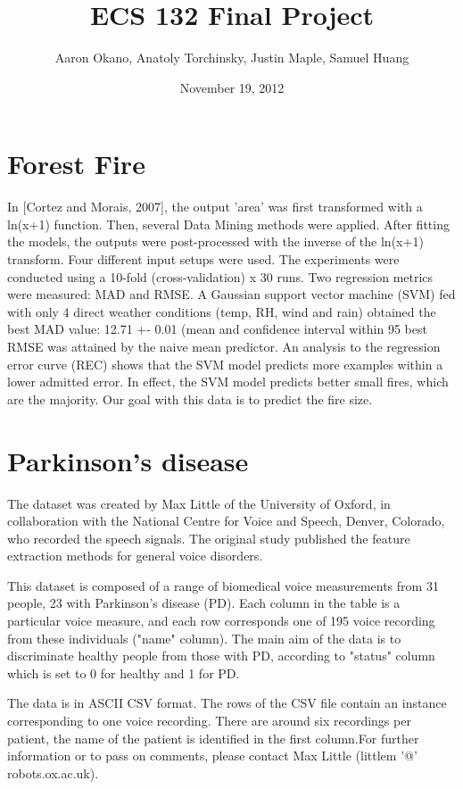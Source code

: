 \documentclass{article}
\title{ECS 132 Final Project}  %
\author{Aaron Okano, Anatoly Torchinsky, Justin Maple, Samuel Huang }    %
\date{November 19, 2012}   %
\begin{document}

\maketitle                 %

\section{Forest Fire}

In [Cortez and Morais, 2007], the output 'area' was first transformed with a ln(x+1) function. 
Then, several Data Mining methods were applied. After fitting the models, the outputs were 
post-processed with the inverse of the ln(x+1) transform. Four different input setups were 
used. The experiments were conducted using a 10-fold (cross-validation) x 30 runs. Two 
regression metrics were measured: MAD and RMSE. A Gaussian support vector machine (SVM) fed 
with only 4 direct weather conditions (temp, RH, wind and rain) obtained the best MAD value: 
12.71 +- 0.01 (mean and confidence interval within 95%
best RMSE was attained by the naive mean predictor. An analysis to the regression error curve 
(REC) shows that the SVM model predicts more examples within a lower admitted error. In effect, 
the SVM model predicts better small fires, which are the majority. Our goal with this data
is to predict the fire size.

\section{Parkinson's disease}

The dataset was created by Max Little of the University of Oxford, in collaboration with the
National Centre for Voice and Speech, Denver, Colorado, who recorded the speech signals.
The original study published the feature extraction methods for general voice disorders.

This dataset is composed of a range of biomedical voice measurements from 31 people, 23 with
Parkinson's disease (PD). Each column in the table is a particular voice measure, and each row
corresponds one of 195 voice recording from these individuals ("name" column). The main aim of
the data is to discriminate healthy people from those with PD, according to "status" column
which is set to 0 for healthy and 1 for PD.

The data is in ASCII CSV format. The rows of the CSV file contain an instance corresponding to
one voice recording. There are around six recordings per patient, the name of the patient is
identified in the first column.For further information or to pass on comments, please contact
Max Little (littlem '@' robots.ox.ac.uk).
\end{document}

